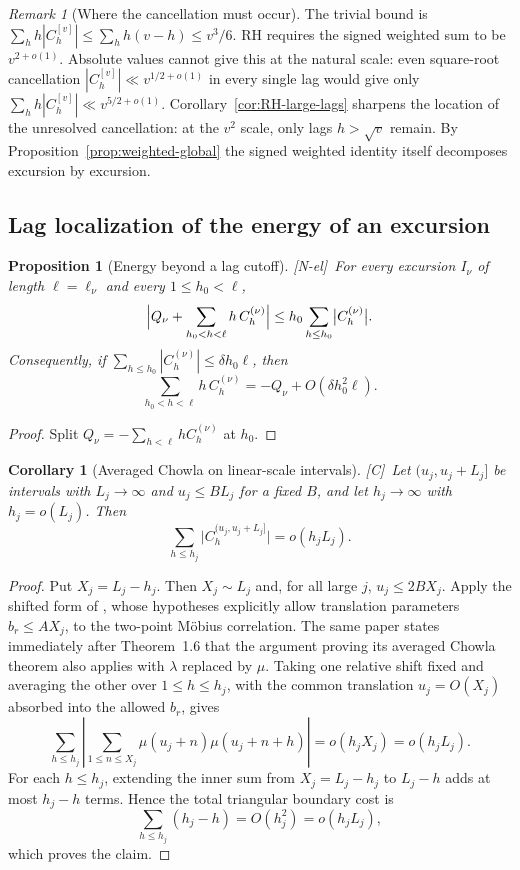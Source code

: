 \documentclass[11pt]{amsart}
\numberwithin{equation}{section}
\theoremstyle{plain}
\newtheorem{proposition}[theorem]{Proposition}
\newtheorem{corollary}[theorem]{Corollary}
\theoremstyle{definition}
\theoremstyle{remark}
\newtheorem{remark}[theorem]{Remark}
\newcommand{\tagNE}{\textup{[N-el]}}
\newcommand{\tagC}{\textup{[C]}}
\begin{document}
\begin{remark}[Where the cancellation must occur]
\label{rem:cross-lag}
The trivial bound is $\sum_hh|C^{[v]}_h|\le\sum_hh(v-h)\le v^3/6$.
RH requires the signed weighted sum to be $v^{2+o(1)}$. Absolute values
cannot give this at the natural scale: even square-root cancellation
$|C^{[v]}_h|\ll v^{1/2+o(1)}$ in every single lag would give only
$\sum_hh|C^{[v]}_h|\ll v^{5/2+o(1)}$. Corollary~\ref{cor:RH-large-lags}
sharpens the location of the unresolved cancellation: at the $v^2$ scale,
only lags $h>\sqrt v$ remain. By Proposition~\ref{prop:weighted-global} the
signed weighted identity itself decomposes excursion by excursion.
\end{remark}

\subsection{Lag localization of the energy of an excursion}

\begin{proposition}[Energy beyond a lag cutoff]
\label{prop:lag-localization}
\tagNE\ For every excursion $I_\nu$ of length $\ell=\ell_\nu$ and every
$1\le h_0<\ell$,
\[
\Bigl|Q_\nu+\sum_{h_0<h<\ell}h\,C^{(\nu)}_h\Bigr|
\le h_0\sum_{h\le h_0}\bigl|C^{(\nu)}_h\bigr| .
\]
Consequently, if $\sum_{h\le h_0}|C^{(\nu)}_h|\le\delta h_0\ell$, then
\[
\sum_{h_0<h<\ell}h\,C^{(\nu)}_h
=-Q_\nu+O(\delta h_0^2\ell).
\]
\end{proposition}

\begin{proof}
Split $Q_\nu=-\sum_{h<\ell}hC^{(\nu)}_h$ at $h_0$.
\end{proof}

\begin{corollary}[Averaged Chowla on linear-scale intervals]
\label{cor:chowla-linear}
\tagC\ Let $(u_j,u_j+L_j]$ be intervals with $L_j\to\infty$ and $u_j\le BL_j$ for a
fixed $B$, and let $h_j\to\infty$ with $h_j=o(L_j)$. Then
\[
\sum_{h\le h_j}\bigl|C^{(u_j,u_j+L_j]}_h\bigr|=o(h_jL_j).
\]
\end{corollary}

\begin{proof}
Put $X_j=L_j-h_j$. Then $X_j\sim L_j$ and, for all large $j$,
$u_j\le2B X_j$. Apply the shifted form of
\cite[Theorem~1.6]{MRT15}, whose hypotheses explicitly allow translation
parameters $b_r\le A X_j$, to the two-point M\"obius correlation. The same
paper states immediately after Theorem~1.6 that the argument proving its
averaged Chowla theorem also applies with $\lambda$ replaced by $\mu$.
Taking one relative shift fixed and averaging the other over
$1\le h\le h_j$, with the common translation $u_j=O(X_j)$ absorbed into
the allowed $b_r$, gives
\[
 \sum_{h\le h_j}\left|
 \sum_{1\le n\le X_j}\mu(u_j+n)\mu(u_j+n+h)
 \right|=o(h_jX_j)=o(h_jL_j).
\]
For each $h\le h_j$, extending the inner sum from $X_j=L_j-h_j$ to
$L_j-h$ adds at most $h_j-h$ terms. Hence the total triangular boundary
cost is
\[
 \sum_{h\le h_j}(h_j-h)=O(h_j^2)=o(h_jL_j),
\]
which proves the claim.
\end{proof}
\end{document}
